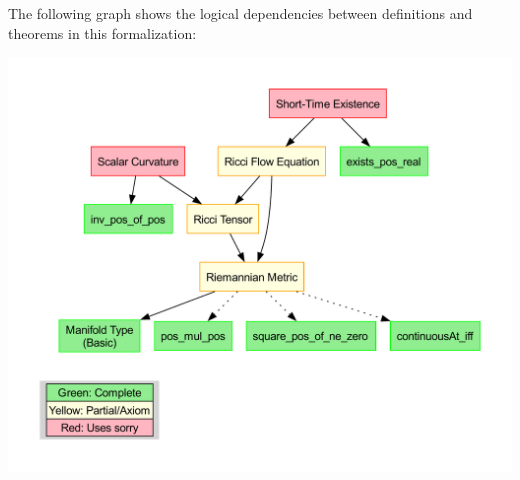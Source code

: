 \documentclass[a4paper]{report}
\theoremstyle{definition}
\theoremstyle{remark}
\begin{document}
The following graph shows the logical dependencies between definitions and theorems in this formalization:

\begin{center}
\includegraphics[width=\textwidth]{dep_graph.pdf}
\end{center}
\end{document}
